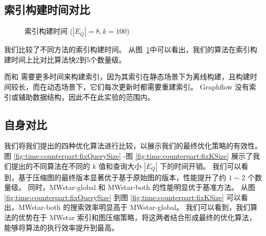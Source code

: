 \subsection{索引构建时间对比}
\label{ch5:index-construction}
\begin{figure}[h!]
    \centering
    \vspace{-0.01in}
    \caption{索引构建时间  ($|E_Q|=8, k=100$)}
    \label{fig:exp:time:index}
\end{figure}    
我们比较了不同方法的索引构建时间。
从图~\ref{fig:exp:time:index}中可以看出，我们的算法在索引构建时间上比对比算法快2到5个数量级。

而\pm 和 \itk 需要更多时间来构建索引，因为其索引在静态场景下为离线构建，且构建时间较长，而在动态场景下，它们每次更新时都需要重建索引。
Graphflow 没有索引或辅助数据结构，因此不在此实验的范围内。


\subsection{自身对比}
\label{ch5:couterparts}




\label{sec:couterparts}
我们将我们提出的四种优化算法进行比较，以展示我们的最终优化策略的有效性。
图 \ref{fig:time:counterpart:fixQuerySize} -图 \ref{fig:time:counterpart:fixKSize} 展示了我们提出的不同算法在不同的 $k$ 值和查询大小 $|E_Q|$ 下的时间开销。
我们可以看到，基于压缩图的最终版本显著优于基于原始图的版本，性能提升了约 $1{\sim}2$ 个数量级。
同时，MWstar-global 和 MWstar-both 的性能明显优于基准方法。
从图 \ref{fig:time:counterpart:fixQuerySize} 到图 \ref{fig:time:counterpart:fixKSize} 可以看出，MWstar-both 的搜索效率明显高于 MWstar-global。
我们可以看到，我们算法的优势在于 MWstar 索引和图压缩策略，将这两者结合形成最终的优化算法，能够将算法的执行效率提升到最高。

